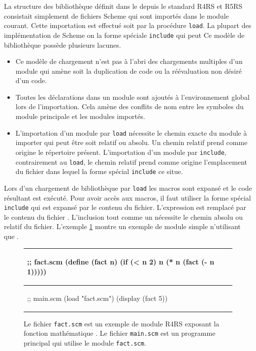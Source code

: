 La structure des bibliothèque définit dans le depuis le standard
R4RS\cite{Scheme:R4RS} et R5RS\cite{Scheme:R5RS} consistait simplement de
fichiers Scheme qui sont importés dans le module courant. Cette importation est
effectué soit par la procédure \texttt{load}. La plupart des implémentation de
Scheme on la forme spéciale \texttt{include} qui peut
Ce modèle de bibliothèque possède plusieurs lacunes.

\begin{itemize}
  \item Ce modèle de chargement n'est pas à l'abri des chargements multiples
    d'un module qui amène soit la duplication de code ou la réévaluation
    non désiré d'un code.

  \item Toutes les déclarations dans un module sont ajoutés à l'environnement
    global lors de l'importation. Cela amène des conflits de nom entre les
    symboles du module principale et les modules importés.

  \item L'importation d'un module par \texttt{load} nécessite le chemin exacte
    du module à importer qui peut être soit relatif ou absolu.  Un chemin
    relatif prend comme origine le répertoire présent.  L'importation d'un
    module par \texttt{include}, contrairement au \texttt{load}, le chemin
    relatif prend comme origine l'emplacement du fichier dans lequel la forme
    spécial \texttt{include} ce situe.

\end{itemize}


Lors d'un chargement de bibliothèque par \texttt{load} les macros sont expansé
et le code résultant est exécuté. Pour avoir accès aux macros, il faut utiliser la
forme spécial \texttt{include} qui est expansé par le contenu du fichier.
L'expression  est remplacé par le contenu du fichier
. L'inclusion tout comme un  nécessite le chemin
absolu ou relatif du fichier. L'exemple \ref{fig:r4rs_fact} montre un exemple
de module simple n'utilisant que .

\begin{figure}[ht]
  \begin{center}
    \begin{tabular}{|l|}
    \hline
    \begin{mplisting}{0.4}
;; fact.scm
(define (fact n)
  (if (< n 2)
    n
    (* n (fact (- n 1)))))
\end{mplisting} \\\hline
    \begin{mplisting}{0.4}
;; main.scm
(load "fact.scm")
(display (fact 5))
\end{mplisting} \\\hline
    \end{tabular}
  \end{center}
  \caption{Le fichier \texttt{fact.scm} est un exemple de module R4RS exposant
  la fonction mathématique . Le fichier \texttt{main.scm} est un
  programme principal qui utilise le module \texttt{fact.scm}.}
  \label{fig:r4rs_fact}
\end{figure}

